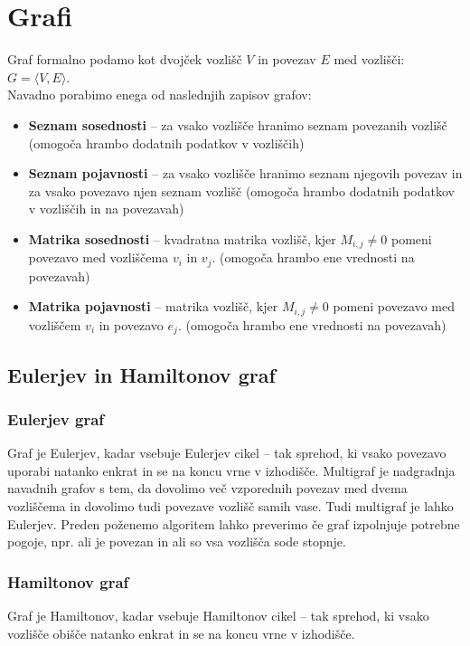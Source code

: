 \documentclass[10pt,a4paper,oneside]{book}
\newenvironment{items}{
\begin{itemize}
  \setlength{\itemsep}{1pt}
  \setlength{\parskip}{0pt}
  \setlength{\parsep}{0pt}
}{\end{itemize}}
\begin{document}
\chapter{Grafi}
Graf formalno podamo kot dvojček vozlišč $V$ in povezav $E$ med vozlišči: $G=\langle V, E \rangle$.\\
Navadno porabimo enega od naslednjih zapisov grafov:
\begin{items}
\item \textbf{Seznam sosednosti} -- za vsako vozlišče hranimo seznam povezanih vozlišč (omogoča hrambo dodatnih podatkov v vozliščih)
\item \textbf{Seznam pojavnosti} -- za vsako vozlišče hranimo seznam njegovih povezav in za vsako povezavo njen seznam vozlišč (omogoča hrambo dodatnih podatkov v vozliščih in na povezavah)
\item \textbf{Matrika sosednosti} -- kvadratna matrika vozlišč, kjer $M_{i,j} \neq 0$ pomeni povezavo med vozliščema $v_i$ in $v_j$. (omogoča hrambo ene vrednosti na povezavah)
\item \textbf{Matrika pojavnosti} -- matrika vozlišč, kjer $M_{i,j} \neq 0$ pomeni povezavo med vozliščem $v_i$ in povezavo $e_j$. (omogoča hrambo ene vrednosti na povezavah)
\end{items}

\section{Eulerjev in Hamiltonov graf}
\subsection{Eulerjev graf}
Graf je Eulerjev, kadar vsebuje Eulerjev cikel -- tak sprehod, ki vsako povezavo uporabi natanko enkrat in se na koncu vrne v izhodišče. Multigraf je nadgradnja navadnih grafov s tem, da dovolimo več vzporednih povezav med dvema vozliščema in dovolimo tudi povezave vozlišč samih vase. Tudi multigraf je lahko Eulerjev. Preden poženemo algoritem lahko preverimo če graf izpolnjuje potrebne pogoje, npr. ali je povezan in ali so vsa vozlišča sode stopnje.

\subsection{Hamiltonov graf}
Graf je Hamiltonov, kadar vsebuje Hamiltonov cikel -- tak sprehod, ki vsako vozlišče obišče natanko enkrat in se na koncu vrne v izhodišče.
\end{document}
